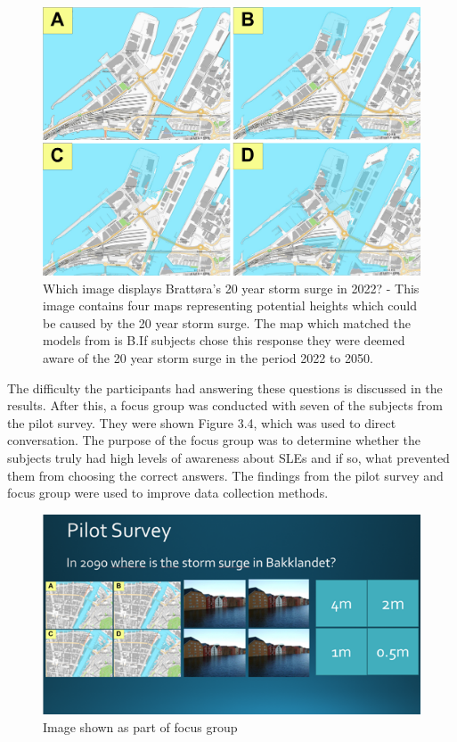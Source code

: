 \begin{figure}[H]
    \centering
    \includegraphics[width=16cm]{fig/brattora question on 2022 20 yr storm surge quadrant.png}
    \caption{Which image displays Brattøra's 20 year storm surge in 2022? - This image contains four maps representing potential heights which could be caused by the 20 year storm surge. The map which matched the models from \cite{kartverket_se_2021} is B.If subjects chose this response they were deemed aware of the 20 year storm surge in the period 2022 to 2050.}
    \label{fig:brattora_2022_stormsurge}
\end{figure}

The difficulty the participants had answering these questions is discussed in the results. After this, a focus group was conducted with seven of the subjects from the pilot survey.  They were shown Figure 3.4, which was used to direct conversation. The purpose of the focus group was to determine whether the subjects truly had high levels of awareness about SLEs and if so, what prevented them from choosing the correct answers. The findings from the pilot survey and focus group were used to improve data collection methods. 

\begin{figure}[H]
    \centering
    \includegraphics[width=1\textwidth]{fig_results/slide-pilot-survey.png}
    \caption{Image shown as part of focus group}
    \label{fig:slide}
\end{figure}


